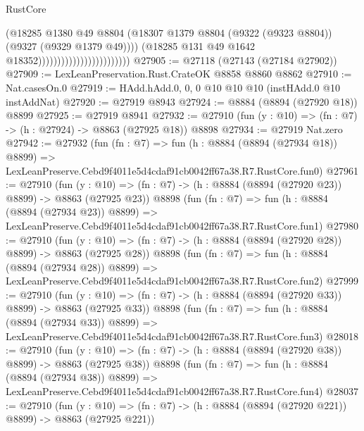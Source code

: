 \begin{lexlean}{RustCore}
\begin{coremodule}
                                                  (@18285
                                                    @1380
                                                    @49
                                                    @8804
                                                    (@18307
                                                      @1379
                                                      @8804
                                                      (@9322 (@9323 @8804))
                                                      (@9327 (@9329 @1379 @49))))
                                                  (@18285
                                                    @131
                                                    @49
                                                    @1642
                                                    @18352))))))))))))))))))))))))
@27905 := @27118 (@27143 (@27184 @27902))
@27909 := LexLeanPreservation.Rust.CrateOK @8858 @8860 @8862
@27910 := Nat.casesOn.{0}
@27919 := HAdd.hAdd.{0, 0, 0} @10 @10 @10 (instHAdd.{0} @10 instAddNat)
@27920 := @27919 @8943
@27924 := @8884 (@8894 (@27920 @18)) @8899
@27925 := @27919 @8941
@27932 := @27910 (fun (y : @10) => (fn : @7) -> (h : @27924) -> @8863 (@27925 @18)) @8898
@27934 := @27919 Nat.zero
@27942 := @27932
    (fun (fn : @7) =>
    fun (h : @8884 (@8894 (@27934 @18)) @8899) =>
    LexLeanPreserve.Cebd9f4011e5d4cdaf91cb0042ff67a38.R7.RustCore.fun0)
@27961 := @27910
    (fun (y : @10) => (fn : @7) -> (h : @8884 (@8894 (@27920 @23)) @8899) -> @8863 (@27925 @23))
    @8898
    (fun (fn : @7) =>
    fun (h : @8884 (@8894 (@27934 @23)) @8899) =>
    LexLeanPreserve.Cebd9f4011e5d4cdaf91cb0042ff67a38.R7.RustCore.fun1)
@27980 := @27910
    (fun (y : @10) => (fn : @7) -> (h : @8884 (@8894 (@27920 @28)) @8899) -> @8863 (@27925 @28))
    @8898
    (fun (fn : @7) =>
    fun (h : @8884 (@8894 (@27934 @28)) @8899) =>
    LexLeanPreserve.Cebd9f4011e5d4cdaf91cb0042ff67a38.R7.RustCore.fun2)
@27999 := @27910
    (fun (y : @10) => (fn : @7) -> (h : @8884 (@8894 (@27920 @33)) @8899) -> @8863 (@27925 @33))
    @8898
    (fun (fn : @7) =>
    fun (h : @8884 (@8894 (@27934 @33)) @8899) =>
    LexLeanPreserve.Cebd9f4011e5d4cdaf91cb0042ff67a38.R7.RustCore.fun3)
@28018 := @27910
    (fun (y : @10) => (fn : @7) -> (h : @8884 (@8894 (@27920 @38)) @8899) -> @8863 (@27925 @38))
    @8898
    (fun (fn : @7) =>
    fun (h : @8884 (@8894 (@27934 @38)) @8899) =>
    LexLeanPreserve.Cebd9f4011e5d4cdaf91cb0042ff67a38.R7.RustCore.fun4)
@28037 := @27910
    (fun (y : @10) => (fn : @7) -> (h : @8884 (@8894 (@27920 @221)) @8899) -> @8863 (@27925 @221))

\end{coremodule}
\end{lexlean}
